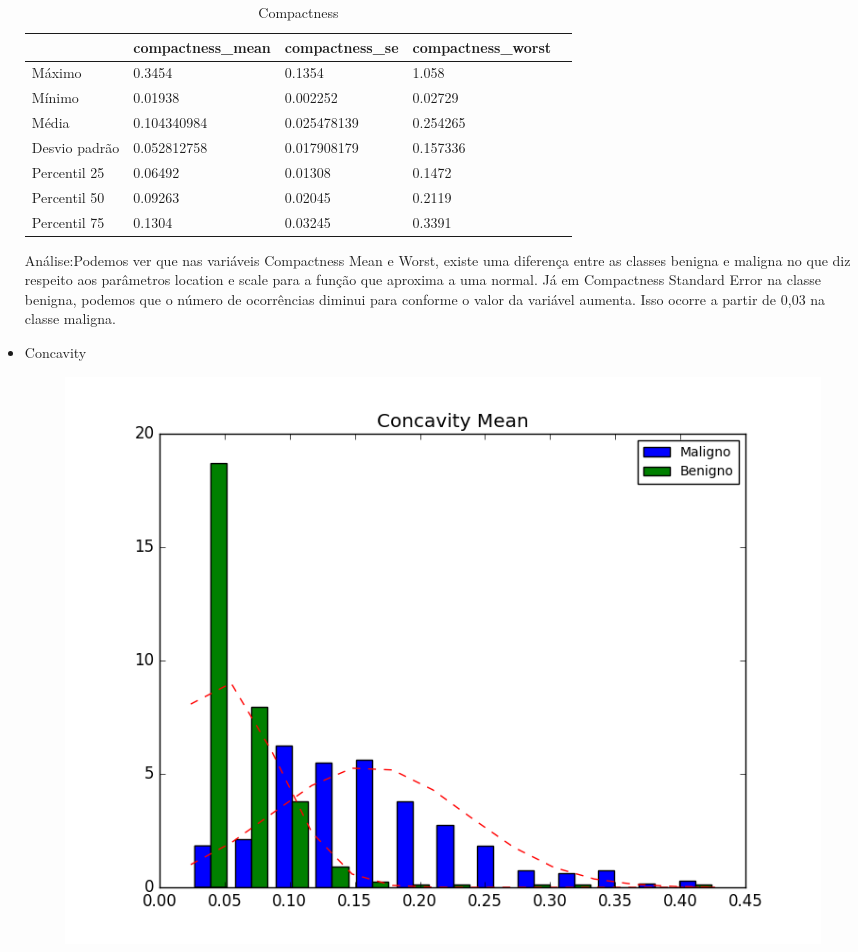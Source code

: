 \documentclass[11pt,a4paper]{article}
\numberwithin{equation}{section}
\begin{document}
\begin{itemize}
\begin{table}[H]
\centering
\caption{Compactness}
\label{my-label}
\begin{tabular}{lllll}\hline
              & compactness\_mean & compactness\_se & compactness\_worst &  \\ \hline
Máximo        & 0.3454            & 0.1354          & 1.058              &  \\
Mínimo        & 0.01938           & 0.002252        & 0.02729            &  \\
Média         & 0.104340984       & 0.025478139     & 0.254265           &  \\
Desvio padrão & 0.052812758       & 0.017908179     & 0.157336           &  \\
Percentil 25  & 0.06492           & 0.01308         & 0.1472             &  \\
Percentil 50  & 0.09263           & 0.02045         & 0.2119             &  \\
Percentil 75  & 0.1304            & 0.03245         & 0.3391             &  \\ \hline
\end{tabular}
\end{table}

Análise:Podemos ver que nas variáveis Compactness Mean e Worst, existe uma diferença entre as classes benigna e maligna no que diz respeito aos parâmetros location e scale para a função que aproxima a uma normal. Já em Compactness Standard Error na classe benigna, podemos que o número de ocorrências diminui para conforme o valor da variável aumenta. Isso ocorre a partir de 0,03 na classe maligna.
\item Concavity
\begin{figure}[H]
\centering
  \includegraphics[width=.5\linewidth]{../img/hist/concavity_mean}
  \label{fig:test1}
\end{figure}%



\end{itemize}
\end{document}
